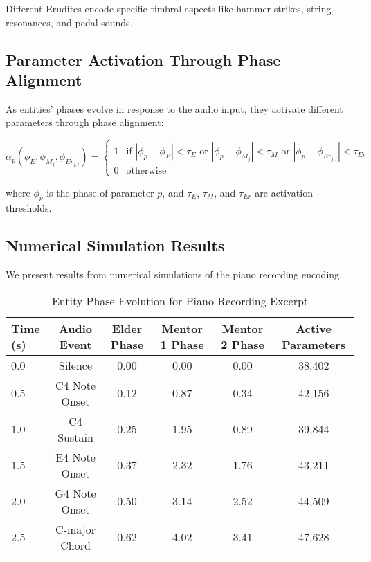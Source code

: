 Different Erudites encode specific timbral aspects like hammer strikes, string resonances, and pedal sounds.

\subsection{Parameter Activation Through Phase Alignment}

As entities' phases evolve in response to the audio input, they activate different parameters through phase alignment:

\begin{equation}
\alpha_p(\phi_E, \phi_{M_j}, \phi_{Er_{j,l}}) = 
\begin{cases}
1 & \text{if } |\phi_p - \phi_E| < \tau_E \text{ or } |\phi_p - \phi_{M_j}| < \tau_M \text{ or } |\phi_p - \phi_{Er_{j,l}}| < \tau_{Er} \\
0 & \text{otherwise}
\end{cases}
\end{equation}

where $\phi_p$ is the phase of parameter $p$, and $\tau_E$, $\tau_M$, and $\tau_{Er}$ are activation thresholds.

\subsection{Numerical Simulation Results}

We present results from numerical simulations of the piano recording encoding.

\begin{table}[ht]
\centering
\caption{Entity Phase Evolution for Piano Recording Excerpt}
\label{tab:piano_phase_evolution}
\begin{tabular}{|l|c|c|c|c|c|}
\hline
\textbf{Time (s)} & \textbf{Audio Event} & \textbf{Elder Phase} & \textbf{Mentor 1 Phase} & \textbf{Mentor 2 Phase} & \textbf{Active Parameters} \\
\hline
0.0 & Silence & 0.00 & 0.00 & 0.00 & 38,402 \\
0.5 & C4 Note Onset & 0.12 & 0.87 & 0.34 & 42,156 \\
1.0 & C4 Sustain & 0.25 & 1.95 & 0.89 & 39,844 \\
1.5 & E4 Note Onset & 0.37 & 2.32 & 1.76 & 43,211 \\
2.0 & G4 Note Onset & 0.50 & 3.14 & 2.52 & 44,509 \\
2.5 & C-major Chord & 0.62 & 4.02 & 3.41 & 47,628 \\
\hline
\end{tabular}
\end{table}

